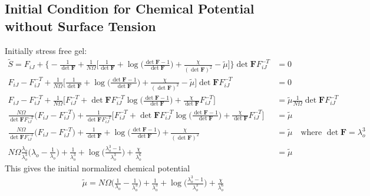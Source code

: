 \documentclass[12pt,3p]{article}
\numberwithin{equation}{section}
\begin{document}
\subsection{Initial Condition for Chemical Potential without Surface Tension}
Initially stress free gel: 
\begin{align*}
\tilde{S} =  F_{iJ} + \bigg\{- \frac{1}{\det \mathbf{F}} + \frac{1}{N \Omega} \bigg[ \frac{1}{\det \mathbf{F}} + \log \bigg( \frac{\det \mathbf{F} - 1}{\det \mathbf{F}} \bigg) + \frac{\chi}{(\det \mathbf{F})^2} - \tilde{\mu} \bigg] \bigg\} \det \mathbf{F} F_{iJ}^{-T} &= 0 \\
		F_{iJ} - F_{iJ}^{-T} + \frac{1}{N \Omega} \bigg[ \frac{1}{\det \mathbf{F}} + \log \bigg( \frac{\det \mathbf{F} - 1}{\det \mathbf{F}} \bigg) + \frac{\chi}{(\det \mathbf{F})^2} - \tilde{\mu} \bigg] \det \mathbf{F} F_{iJ}^{-T} &= 0 \\
		F_{iJ} - F_{iJ}^{-T} + \frac{1}{N \Omega} \bigg[ F_{iJ}^{-T} + \det \mathbf{F} F_{iJ}^{-T} \log \bigg( \frac{\det \mathbf{F} - 1}{\det \mathbf{F}} \bigg) + \frac{\chi}{\det \mathbf{F}} F_{iJ}^{-T}\bigg] &=  \tilde{\mu} \frac{1}{N \Omega} \det \mathbf{F} F_{iJ}^{-T} \\
		 \frac{N \Omega}{\det \mathbf{F} F_{iJ}^{-T}} \bigg( F_{iJ} - F_{iJ}^{-T} \bigg) + \frac{1}{\det \mathbf{F} F_{iJ}^{-T}} \bigg[ F_{iJ}^{-T} + \det \mathbf{F} F_{iJ}^{-T} \log \bigg( \frac{\det \mathbf{F} - 1}{\det \mathbf{F}} \bigg) + \frac{\chi}{\det \mathbf{F}} F_{iJ}^{-T}\bigg] &=  \tilde{\mu} \\
		  \frac{N \Omega}{\det \mathbf{F} F_{iJ}^{-T}} \bigg( F_{iJ} - F_{iJ}^{-T} \bigg) + \frac{1}{\det \mathbf{F}} + \log \bigg( \frac{\det \mathbf{F} - 1}{\det \mathbf{F}} \bigg) + \frac{\chi}{(\det \mathbf{F})^2} &=  \tilde{\mu} \quad \text{where } \det \mathbf{F} = \lambda_o^3 \\
		  N \Omega \frac{\lambda_o}{\lambda_o^3} \bigg( \lambda_o - \frac{1}{\lambda_o} \bigg) + \frac{1}{\lambda_o^3} + \log \bigg( \frac{\lambda_o^3 - 1}{\lambda_o^3} \bigg) + \frac{\chi}{\lambda_o^6} &= \tilde{\mu} 
\end{align*}
This gives the initial normalized chemical potential
\begin{align*}
 \tilde{\mu} = N \Omega \bigg( \frac{1}{\lambda_o} - \frac{1}{\lambda_o^3} \bigg) + \frac{1}{\lambda_o^3} + \log \bigg( \frac{\lambda_o^3 - 1}{\lambda_o^3} \bigg) + \frac{\chi}{\lambda_o^6} 
\end{align*}

\end{document}
